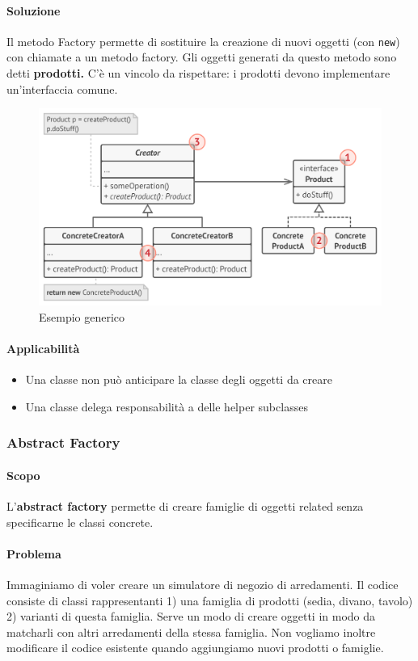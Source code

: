 \documentclass[11pt]{article}
\newcommand{\code}[1]{\texttt{#1}}
\begin{document}
\paragraph{Soluzione}
Il metodo Factory permette di sostituire la creazione di nuovi oggetti (con \code{new}) con chiamate a un metodo factory. Gli oggetti generati da questo metodo sono detti \textbf{prodotti.} C'è un vincolo da rispettare: i prodotti devono implementare un'interfaccia comune.
\begin{figure}[H]
    \centering
    \includegraphics[width=\linewidth]{res/teoria/Factory.png}
    \caption{Esempio generico}
\end{figure}
\paragraph{Applicabilità}
\begin{itemize}
    \item Una classe non può anticipare la classe degli oggetti da creare
    \item Una classe delega responsabilità a delle helper subclasses
\end{itemize}
\subsubsection{Abstract Factory}
\paragraph{Scopo}
L'\textbf{abstract factory} permette di creare famiglie di oggetti related senza specificarne le classi concrete.
\paragraph{Problema}
Immaginiamo di voler creare un simulatore di negozio di arredamenti. Il codice consiste di classi rappresentanti 1) una famiglia di prodotti (sedia, divano, tavolo) 2) varianti di questa famiglia. 
Serve un modo di creare oggetti in modo da matcharli con altri arredamenti della stessa famiglia. Non vogliamo inoltre modificare il codice esistente quando aggiungiamo nuovi prodotti o famiglie. 
\end{document}
